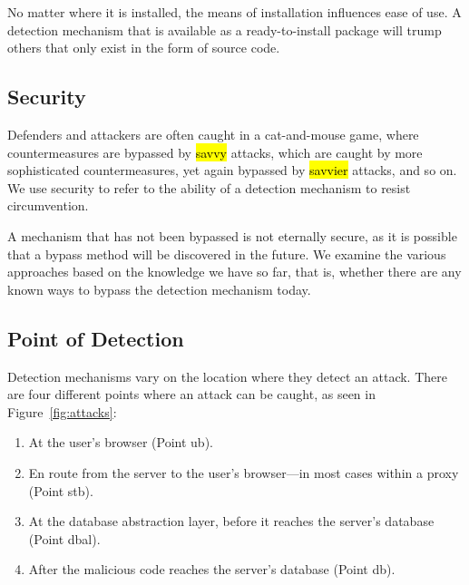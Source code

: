 \documentclass[10pt,journal,compsoc]{IEEEtran}
\newcommand{\hlc}[2][yellow]{ {\sethlcolor{#1} \hl{#2}} }
\begin{document}
No matter where it is installed, the means of installation influences
ease of use. A detection mechanism that is available as a ready-to-install
package will trump others that only exist in the form
of source code. 

\subsection{Security}

Defenders and attackers are often caught in a cat-and-mouse game,
where countermeasures are bypassed by \hlc[yellow]{savvy} attacks, which are caught
by more sophisticated countermeasures, yet again bypassed by \hlc[yellow]{savvier}
attacks, and so on. We use security to refer to the ability of a
detection mechanism to resist circumvention. 

A mechanism that has not been bypassed is not eternally secure, as it
is possible that a bypass method will be discovered in the future. We
examine the various approaches based on the knowledge we have so far,
that is, whether there are any known ways to bypass the detection
mechanism today.

\subsection{Point of Detection}
\label{sec:point}

Detection mechanisms vary on the location where they detect an attack.
There are four different points where an attack can be caught, as seen
in Figure~\ref{fig:attacks}:
\vspace{-0.5mm}
\begin{enumerate}
\item At the user's browser (Point {\sc ub}).
\item En route from the server to the user's browser---in most cases
within a proxy (Point {\sc s}t{\sc b}).
\item At the database abstraction layer, before it reaches the server's database
  (Point {\sc dbal}).
\item After the malicious code reaches the server's database
  (Point {\sc db}).
\end{enumerate}
\vspace{-0.5mm}
\end{document}
